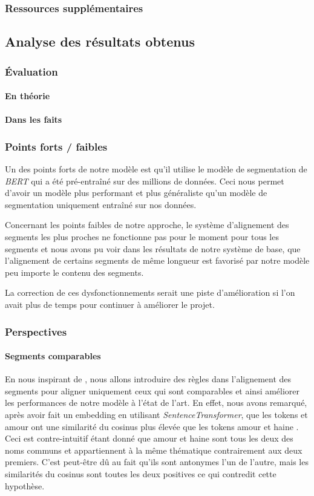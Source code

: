 \documentclass[a4paper, twoside, 11pt]{article}
\begin{document}
 \subsubsection{Ressources supplémentaires}

 \subsection{Analyse des résultats obtenus}
 \subsubsection{Évaluation}
 \paragraph{En théorie}
 \paragraph{Dans les faits}


 \subsubsection{Points forts / faibles}
 Un des points forts de notre modèle est qu'il utilise le modèle de segmentation de \textit{BERT} qui a été pré-entraîné sur des millions de données. Ceci nous permet d'avoir un modèle plus performant et plus généraliste qu'un modèle de segmentation uniquement entraîné sur nos données.

Concernant les points faibles de notre approche, le système d'alignement des segments les plus proches ne fonctionne pas pour le moment pour tous les segments et nous avons pu voir dans les résultats de notre système de base, que l'alignement de certains segments de même longueur est favorisé par notre modèle peu importe le contenu des segments.

La correction de ces dysfonctionnements serait une piste d'amélioration si l'on avait plus de temps pour continuer à améliorer le projet.
 \subsubsection{Perspectives}
 \paragraph{Segments comparables}
       \hfill \break
En nous inspirant de \cite{banjade}, nous allons introduire des règles dans l’alignement des segments pour aligner uniquement ceux qui sont \og comparables \fg{} et ainsi améliorer les performances de notre modèle à l'état de l'art. En effet, nous avons remarqué, après avoir fait un \og embedding \fg{} en utilisant \textit{SentenceTransformer}, que les tokens  \fg{} et \og amour \fg{} ont une similarité du cosinus plus élevée que les tokens \og amour \fg{} et  \og haine \fg{}. Ceci est contre-intuitif étant donné que \og amour \fg{} et \og haine \fg{} sont tous les deux des noms communs et appartiennent à la même thématique contrairement aux deux premiers. C'est peut-être dû au fait qu'ils sont antonymes l’un de l’autre, mais les similarités du cosinus sont toutes les deux positives ce qui contredit cette hypothèse.
\end{document}
